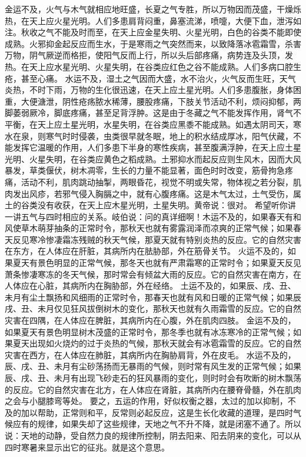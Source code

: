 \documentclass[12pt,UTF8]{ctexbook}
\begin{document}
金运不及，火气与木气就相应地旺盛，长夏之气专胜，所以万物因而茂盛，干燥烁热，在天上应火星光明。人们多患肩背闷重，鼻塞流涕，喷嚏，大便下血，泄泻如注。秋收之气不能及时而至，在天上应金星失明、火星光明，白色的谷类不能即使成熟。火邪抑金起反应而生水，于是寒雨之气突然而来，以致降落冰雹霜雪，杀害万物，阴气厥逆而格拒，使阳气反而上行，所以头后部疼痛，病势连及头顶，发热。在天上应水星光明、火星失明，在谷类应红色之谷不能成熟。人们多病口腔生疮，甚至心痛。
水运不及，湿土之气因而大盛，水不治火，火气反而生旺，天气炎热，不时下雨，万物的生化很迅速，在天上应土星光明。人们多患腹胀，身体困重，大便溏泄，阴性疮疡脓水稀薄，腰股疼痛，下肢关节活动不利，烦闷抑郁，两脚萎弱厥冷，脚底疼痛，甚至足背浮肿。这是由于冬藏之气不能发挥作用，肾气不平衡，在天上应土星光明，水星失明，在谷类应黑黍不能成熟。如遇太阴司天，寒水在泉，则寒气时时侵袭，虫类很早就冬眠，地上的积水结成厚冰，阳气伏藏，不能发挥它温暖的作用，人们多患下半身的寒性疾病，甚至腹满浮肿，在天上应土星光明、火星失明，在谷类应黄色之稻成熟。土邪抑水而起反应则生风木，因而大风暴发，草类偃伏，树木凋零，生长的力量不能显著，面色时时改变，筋骨拘急疼痛，活动不利，肌肉跳动抽掣，两眼昏花，视觉不明或失常，物体视之若分裂，肌肉发出风疹，若邪气侵入胸膈之中，就有心腹疼痛。这是木气太过，土气受伤，属土的谷类没有收获，在天上应木星光明，土星失明。黄帝说：很对。
希望听你讲一讲五气与四时相应的关系。岐伯说：问的真详细啊！木运不及的，如果春天有和风使草木萌芽抽条的正常时令，那秋天也就有雾露润泽而凉爽的正常气候；如果春天反见寒冷惨凄霜冻残贼的秋天气候，那夏天就有特别炎热的反应。它的自然灾害在东方，在人体应在肝脏，其病所内在胠胁部，外在筋骨关节。
火运不及的，如果夏天有景色明显的正常气候，那冬天也就有严肃霜寒的正常时令；如果夏天反见萧条惨凄寒冻的冬天气候，那时常会有倾盆大雨的反应。它的自然灾害在南方，在人体应在心脏，其病所内在胸胁部，外在经络。
土运不及的，如果辰、戌、丑、未月有尘土飘扬和风细雨的正常时令，那春天也就有风和日暖的正常气候；如果辰戌、丑、未月仅见狂风拔倒树木的变化，那秋天也就有久雨霜雪的反应。它的自然灾害在四隅，在人体应在脾脏，其病所内在心腹，外在肌肉四肢。
金运不及的，如果夏天有景色明显树木茂盛的正常时令，那冬季也就有冰冻寒冷的正常气候；如果夏天出现如火烧灼的过于炎热的气候，那秋天就会有冰雹霜雪的反应。它的自然灾害在西方，在人体应在肺脏，其病所内在胸胁肩背，外在皮毛。
水运不及的，辰、戌、丑、未月有尘砂荡扬而无暴雨的气候，则时常有风生发的正常气候；如果辰、戌、丑、未月有出现飞砂走石的狂风暴雨的变化，则时时会有吹断的树木飘荡的反应。它的自然灾害在北方，在人体应在肾脏，其病所内在腰脊骨髓，外在肌肉之会与小腿膝弯等处。
要之，五运的作用，好似权衡之器，太过的加以抑制，不及的加以帮助，正常则和平，反常则必起反应，这是生长化收藏的道理，是四时气候应有的规律，如果失却了这些规律，天地之气不升不降，就是闭塞不通了。所以说：天地的动静，受自然力良的规律所控制，阴去阳来、阳去阴来的变化，可以从四时寒暑来显示出它的征兆。就是这个意思。
\end{document}
